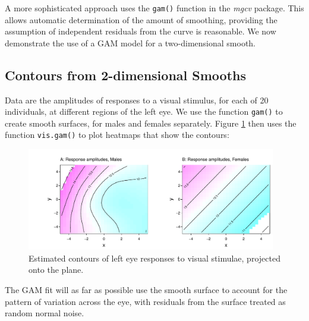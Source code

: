 \documentclass{tufte-book}\usepackage[]{graphicx}\usepackage[]{color}
\newcommand{\txtt}[1]{\texttt{#1}}
\begin{document}
A more sophisticated approach uses the \txtt{gam()} function
in the {\em mgcv} package.  This allows automatic determination of the
amount of smoothing, providing the assumption of independent residuals
from the curve is reasonable.  We now demonstrate the use of a GAM
model for a two-dimensional smooth.

\subsection{Contours from 2-dimensional Smooths}
Data are the amplitudes of responses to a visual stimulus, for each of
20 individuals, at different regions of the left eye.  We use the
function \txtt{gam()} to create smooth
surfaces, for males and females separately. Figure \ref{fig:visAmp}
then uses the function \txtt{vis.gam()} to plot heatmaps that show the
contours:
\begin{fullwidth}
\begin{figure}
\begin{Schunk}


\centerline{\includegraphics[width=0.97\textwidth]{figs/9-plotVIS-1} }

\end{Schunk}
\vspace*{-7pt}
\caption{Estimated contours of left eye responses to visual stimulae,
projected onto the plane.\label{fig:visAmp}}
\vspace*{15pt}
\end{figure}
\end{fullwidth}
\enlargethispage{12pt}

The GAM fit will as far as possible use the smooth surface
to account for the pattern of variation across the eye, with
residuals from the surface treated as random normal noise.
\vspace*{7pt}
\end{document}
